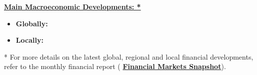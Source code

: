 \noindent
{\fontsize{10}{13}\selectfont \textbf{\color{black} \underline{Main Macroeconomic Developments: *}}} \vspace{0.5em}

\begin{itemize} \itemsep0.6em
    \item \fontsize{10}{13}\selectfont \textbf{Globally:} 

    \item \fontsize{10}{13}\selectfont \textbf{Locally:} 
\end{itemize}

\vfill

\noindent
{\fontsize{9}{11}\selectfont
* For more details on the latest global, regional and local financial developments, refer to the monthly financial report (\textbf{\color{eceslink} \underline{Financial Markets Snapshot}}).
}

\restoregeometry
